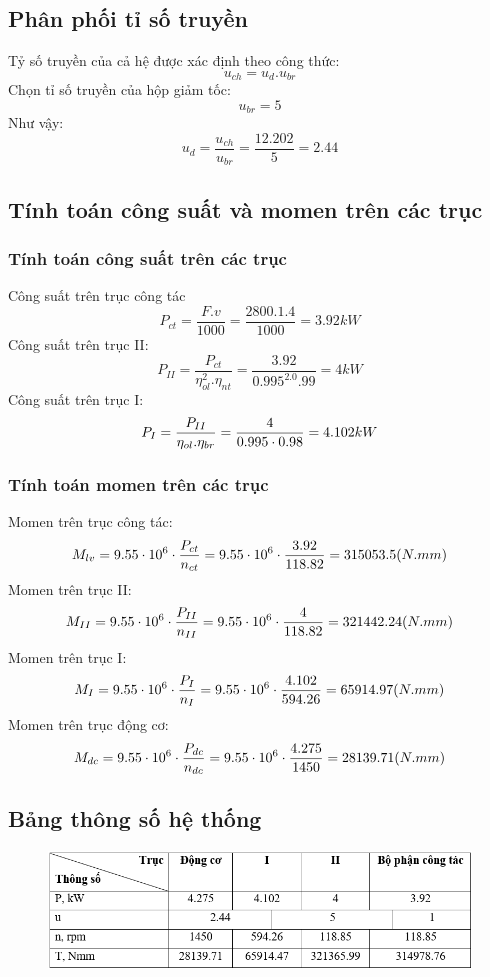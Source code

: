 \subsection{Phân phối tỉ số truyền}
Tỷ số truyền của cả hệ được xác định theo công thức:
\[
    u_{ch} = u_d.u_{br} 
\]
Chọn tỉ số truyền của hộp giảm tốc:
\[
    u_{br} = 5
\]
Như vậy: 
\[
    u_d = \frac{u_{ch}}{u_{br}} = \frac{12.202}{5} = 2.44
\]

\subsection{Tính toán công suất và momen trên các trục}
\subsubsection{Tính toán công suất trên các trục}
Công suất trên trục công tác
\[
    P_{ct} = \frac{F.v}{1000} = \frac{2800.1.4}{1000} = 3.92 kW
\]
Công suất trên trục II:
\[
    P_{II} = \frac{P_{ct}}{\eta_{ol}^2.\eta_{nt}} = \frac{3.92}{0.995^2.0.99} = 4 kW
\]
Công suất trên trục I:
\[
    P_{I} = \frac{P_{II}}{\eta_{ol}.\eta_{br}} = \frac{4}{0.995 \cdot 0.98} = 4.102 kW \\
\]
\subsubsection{Tính toán momen trên các trục}
Momen trên trục công tác:
\[
    M_{lv} = 9.55 \cdot 10^6 \cdot \frac{P_{ct}}{n_{ct}} = 9.55 \cdot 10^6 \cdot \frac{3.92}{118.82} = 315053.5 (N.mm) \\
\]
Momen trên trục II:
\[
    M_{II} = 9.55 \cdot 10^6 \cdot \frac{P_{II}}{n_{II}} = 9.55 \cdot 10^6 \cdot \frac{4}{118.82} = 321442.24 (N.mm) \\
\]
Momen trên trục I:
\[
    M_{I} = 9.55 \cdot 10^6 \cdot \frac{P_{I}}{n_{I}} = 9.55 \cdot 10^6 \cdot \frac{4.102}{594.26} = 65914.97 (N.mm) \\
\]
Momen trên trục động cơ:
\[
    M_{dc} = 9.55 \cdot 10^6 \cdot \frac{P_{dc}}{n_{dc}} = 9.55 \cdot 10^6 \cdot \frac{4.275}{1450} = 28139.71 (N.mm) \\
\]

\subsection{Bảng thông số hệ thống}
\begin{figure}[H]
    \centering
    \includegraphics[width=1\textwidth]{pictures/bangdactinh.png}
\end{figure}